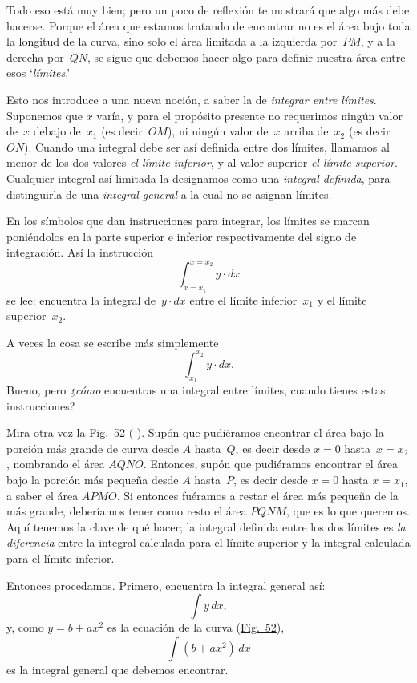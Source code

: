 \documentclass[12pt]{book}[2005/09/16]
\newcommand{\DPPageSep}[2]{\Pagelabel{#2}}
\newcommand{\Pagelabel}[1]
  {\phantomsection\label{#1}}
\newcommand{\Pageref}[2][p.]{%
  \ifthenelse{\not\equal{#1}{}}{%
    \hyperref[#2]{#1~\pageref{#2}}%
  }{%
    \hyperref[#2]{\pageref{#2}}%
  }%
}
\newcommand{\Fig}[1]{\hyperref[fig:#1]{Fig.~#1}}
\begin{document}
Todo eso está muy bien; pero un poco de reflexión te mostrará
que algo más debe hacerse. Porque el
área que estamos tratando de encontrar no es el área bajo toda
la longitud de la curva, sino solo el área limitada
a la izquierda por~$PM$, y a la derecha por~$QN$, se sigue
que debemos hacer algo para definir nuestra área entre
esos `\emph{límites}.'\Pagelabel{limits} %

Esto nos introduce a una nueva noción, a saber la de
\emph{integrar entre límites}. Suponemos que $x$ varía,
y para el propósito presente no requerimos ningún
valor de~$x$ debajo de~$x_1$ (es decir~$OM$), ni ningún valor de~$x$
arriba de~$x_2$ (es decir~$ON$). Cuando una integral debe ser
así definida entre dos límites, llamamos al menor
de los dos valores \emph{el límite inferior}, y al valor superior
\emph{el límite superior}. Cualquier integral así limitada
la designamos como una \emph{integral definida}, para distinguirla
de una \emph{integral general} a la cual no se
asignan límites.

En los símbolos que dan instrucciones para integrar,
los límites se marcan poniéndolos en la parte superior
e inferior respectivamente del signo de integración.
Así la instrucción
\[
\int_{x=x_1}^{x=x_2} y · dx
\]
\DPPageSep{221.png}{209}%
se lee: encuentra la integral de~$y · dx$ entre el
límite inferior~$x_1$ y el límite superior~$x_2$.

A veces la cosa se escribe más simplemente
\[
\int^{x_2}_{x_1} y · dx.
\]
Bueno, pero \emph{¿cómo} encuentras una integral entre límites,
cuando tienes estas instrucciones?

Mira otra vez la \Fig{52} (\Pageref{fig:52}). Supón que pudiéramos %
encontrar el área bajo la porción más grande de curva desde
$A$ hasta~$Q$, es decir desde $x = 0$ hasta~$x = x_2$, nombrando el área
$AQNO$. Entonces, supón que pudiéramos encontrar el área bajo
la porción más pequeña desde $A$ hasta~$P$, es decir desde $x = 0$ hasta
$x = x_1$, a saber el área $APMO$. Si entonces fuéramos a
restar el área más pequeña de la más grande, deberíamos
tener como resto el área $PQNM$, que es
lo que queremos. Aquí tenemos la clave de qué
hacer; la integral definida entre los dos límites es
\emph{la diferencia} entre la integral calculada para
el límite superior y la integral calculada para el
límite inferior.

Entonces procedamos. Primero, encuentra la
integral general así:
\[
\int y\, dx,
\]
y, como $y = b + ax^2$ es la ecuación de la curva (\Fig{52}),
\[
\int (b + ax^2)\, dx
\]
es la integral general que debemos encontrar.
\end{document}
